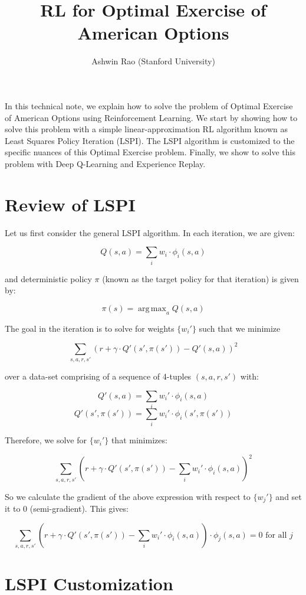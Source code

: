 \documentclass[12pt]{amsart}
\title{RL for Optimal Exercise of American Options}
\author{Ashwin Rao (Stanford University)}
\date{} %
\DeclareMathOperator*{\argmax}{arg\,max}
\begin{document}
\maketitle

In this technical note, we explain how to solve the problem of Optimal Exercise of American Options using Reinforcement Learning. We start by showing how to solve this problem with a simple linear-approximation RL algorithm known as Least Squares Policy Iteration (LSPI). The LSPI algorithm is customized to the specific nuances of this Optimal Exercise problem.  Finally, we show to solve this problem with Deep Q-Learning and Experience Replay.

\section{Review of LSPI}

Let us first consider the general LSPI algorithm. In each iteration, we are given:

$$Q(s,a) = \sum_i w_i \cdot \phi_i(s,a)$$

and deterministic policy $\pi$ (known as the target policy for that iteration) is given by:

$$\pi(s) = \argmax_a Q(s,a)$$

The goal in the iteration is to solve for weights $\{w_i'\}$ such that we minimize

$$\sum_{s,a,r,s'} (r + \gamma \cdot Q'(s',\pi(s')) - Q'(s,a))^2$$

over a data-set comprising of a sequence of 4-tuples $(s,a,r,s')$ with:

$$Q'(s,a) = \sum_i w_i' \cdot \phi_i(s,a)$$
$$Q'(s',\pi(s')) = \sum_i w_i' \cdot \phi_i(s', \pi(s'))$$

Therefore, we solve for $\{w_i'\}$ that minimizes:

$$\sum_{s,a,r,s'} (r + \gamma \cdot Q'(s',\pi(s')) - \sum_i w_i' \cdot \phi_i(s,a))^2$$

So we calculate the gradient of the above expression with respect to $\{w_j'\}$ and set it to 0 (semi-gradient). This gives:

\begin{equation}
\sum_{s,a,r,s'} (r + \gamma \cdot Q'(s',\pi(s')) - \sum_i w_i' \cdot \phi_i(s,a)) \cdot \phi_j(s,a) = 0 \text{ for all } j
\label{eq:general-lspi}
\end{equation}

\section{LSPI Customization}
\end{document}
